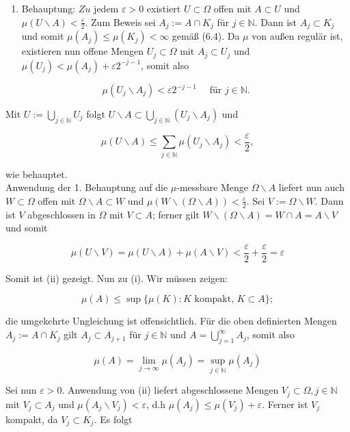 \documentclass[10pt, letterpaper]{article}
\begin{document}
\begin{enumerate}
  \item Behauptung: $Z u$ jedem $\varepsilon>0$ existiert $U \subset \Omega$ offen mit $A \subset U$ und $\mu(U \backslash A)<\frac{\varepsilon}{2}$. Zum Beweis sei $A_{j}:=A \cap K_{j}$ für $j \in \mathbb{N}$. Dann ist $A_{j} \subset K_{j}$ und somit $\mu\left(A_{j}\right) \leq \mu\left(K_{j}\right)<\infty$ gemäß (6.4). Da $\mu$ von außen regulär ist, existieren nun offene Mengen $U_{j} \subset \Omega$ mit $A_{j} \subset U_{j}$ und $\mu\left(U_{j}\right)<\mu\left(A_{j}\right)+\varepsilon 2^{-j-1}$, somit also
\end{enumerate}

$$
\mu\left(U_{j} \backslash A_{j}\right)<\varepsilon 2^{-j-1} \quad \text { für } j \in \mathbb{N} \text {. }
$$

Mit $U:=\bigcup_{j \in \mathbb{N}} U_{j}$ folgt $U \backslash A \subset \bigcup_{j \in \mathbb{N}}\left(U_{j} \backslash A_{j}\right)$ und

$$
\mu(U \backslash A) \leq \sum_{j \in \mathbb{N}} \mu\left(U_{j} \backslash A_{j}\right)<\frac{\varepsilon}{2},
$$

wie behauptet.\\
Anwendung der 1. Behauptung auf die $\mu$-messbare Menge $\Omega \backslash A$ liefert nun auch $W \subset \Omega$ offen mit $\Omega \backslash A \subset W$ und $\mu(W \backslash(\Omega \backslash A))<\frac{\varepsilon}{2}$. Sei $V:=\Omega \backslash W$. Dann ist $V$ abgeschlossen in $\Omega$ mit $V \subset A$; ferner gilt $W \backslash(\Omega \backslash A)=W \cap A=A \backslash V$ und somit

$$
\mu(U \backslash V)=\mu(U \backslash A)+\mu(A \backslash V)<\frac{\varepsilon}{2}+\frac{\varepsilon}{2}=\varepsilon
$$

Somit ist (ii) gezeigt. Nun zu (i). Wir müssen zeigen:

$$
\mu(A) \leq \sup \{\mu(K): K \text { kompakt, } K \subset A\} ;
$$

die umgekehrte Ungleichung ist offensichtlich. Für die oben definierten Mengen $A_{j}:= A \cap K_{j}$ gilt $A_{j} \subset A_{j+1}$ für $j \in \mathbb{N}$ und $A=\bigcup_{j=1}^{\infty} A_{j}$, somit also

$$
\mu(A)=\lim _{j \rightarrow \infty} \mu\left(A_{j}\right)=\sup _{j \in \mathbb{N}} \mu\left(A_{j}\right)
$$

Sei nun $\varepsilon>0$. Anwendung von (ii) liefert abgeschlossene Mengen $V_{j} \subset \Omega, j \in \mathbb{N}$ mit $V_{j} \subset A_{j}$ und $\mu\left(A_{j} \backslash V_{j}\right)<\varepsilon$, d.h $\mu\left(A_{j}\right) \leq \mu\left(V_{j}\right)+\varepsilon$. Ferner ist $V_{j}$ kompakt, da $V_{j} \subset K_{j}$. Es folgt
\end{document}
